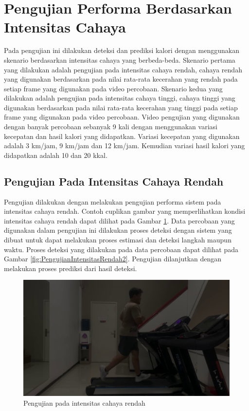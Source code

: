\section{Pengujian Performa Berdasarkan Intensitas Cahaya}
\label{sec:PengujianIntensitas}

Pada pengujian ini dilakukan deteksi dan prediksi kalori dengan menggunakan skenario berdasarkan intensitas cahaya yang berbeda-beda. Skenario pertama yang dilakukan adalah pengujian pada intensitas cahaya rendah, cahaya rendah yang digunakan berdasarkan pada nilai rata-rata kecerahan yang rendah pada setiap frame yang digunakan pada video percobaan. Skenario kedua yang dilakukan adalah pengujian pada intensitas cahaya tinggi, cahaya tinggi yang digunakan berdasarkan pada nilai rata-rata kecerahan yang tinggi pada setiap frame yang digunakan pada video percobaan. Video pengujian yang digunakan dengan banyak percobaan sebanyak 9 kali dengan menggunakan variasi kecepatan dan hasil kalori yang didapatkan. Variasi kecepatan yang digunakan adalah 3 km/jam, 9 km/jam dan 12 km/jam. Kemudian variasi hasil kalori yang didapatkan adalah 10 dan 20 kkal. 

\subsection{Pengujian Pada Intensitas Cahaya Rendah}
\label{subsec:PengujianIntensitasRendah}

Pengujian dilakukan dengan melakukan pengujian performa sistem pada intensitas cahaya rendah. Contoh cuplikan gambar yang memperlihatkan kondisi intensitas cahaya rendah dapat dilihat pada Gambar \ref{fig:PengujianIntensitasRendah}. Data percobaan yang digunakan dalam pengujian ini dilakukan proses deteksi dengan sistem yang dibuat untuk dapat melakukan proses estimasi dan deteksi langkah maupun waktu. Proses deteksi yang dilakukan pada data percobaan dapat dilihat pada Gambar \ref{fig:PengujianIntensitasRendah2}. Pengujian dilanjutkan dengan melakukan proses prediksi dari hasil deteksi.

\begin{figure}[H]
  \centering
  \includegraphics[scale=0.5]{gambar/cahaya_rendah.png}
  \caption{Pengujian pada intensitas cahaya rendah}
  \label{fig:PengujianIntensitasRendah}
\end{figure}

